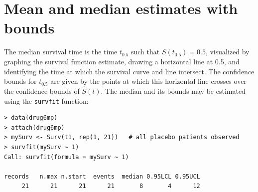 \documentclass[article]{jss}
\begin{document}
\pagebreak

\section[Mean and median estimates with bounds]{Mean and median estimates with bounds}
\label{meanAndMedianEstimates}

The median survival time is the time $t_{0.5}$ such that $S(t_{0.5}) = 0.5$, visualized by graphing the survival function estimate, drawing a horizontal line at 0.5, and identifying the time at which the survival curve and line intersect. The confidence bounds for $t_{0.5}$ are given by the points at which this horizontal line crosses over the confidence bounds of $\hat{S}(t)$. The median and its bounds may be estimated using the \texttt{survfit} function:
\begin{verbatim}
> data(drug6mp)
> attach(drug6mp)
> mySurv <- Surv(t1, rep(1, 21))   # all placebo patients observed
> survfit(mySurv ~ 1)
Call: survfit(formula = mySurv ~ 1)

records   n.max n.start  events  median 0.95LCL 0.95UCL 
     21      21      21      21       8       4      12 
\end{verbatim}
\end{document}
